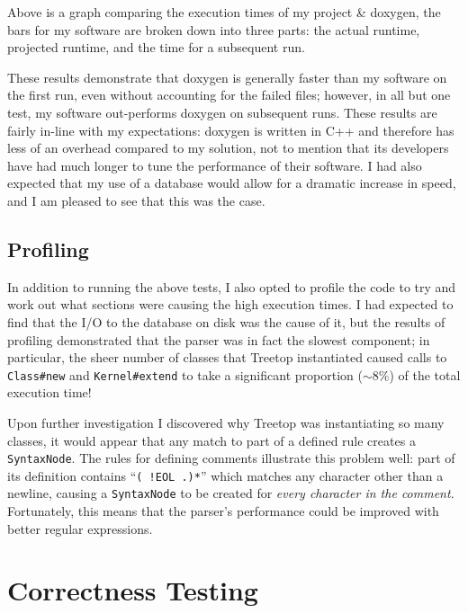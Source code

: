 \noindent{}

Above is a graph comparing the execution times of my project \& doxygen, the
bars for my software are broken down into three parts: the actual runtime,
projected runtime, and the time for a subsequent run.

These results demonstrate that doxygen is generally faster than my software on
the first run, even without accounting for the failed files; however, in all but
one test, my software out-performs doxygen on subsequent runs. These results are
fairly in-line with my expectations: doxygen is written in C++ and therefore has
less of an overhead compared to my solution, not to mention that its developers
have had much longer to tune the performance of their software. I had also
expected that my use of a database would allow for a dramatic increase in speed,
and I am pleased to see that this was the case.

  \subsection{Profiling}
  In addition to running the above tests, I also opted to profile the code to
  try and work out what sections were causing the high execution times. I had
  expected to find that the I/O to the database on disk was the cause of it, but
  the results of profiling demonstrated that the parser was in fact the slowest
  component; in particular, the sheer number of classes that Treetop
  instantiated caused calls to \lstinline|Class#new| and
  \lstinline|Kernel#extend| to take a significant proportion ($\sim$8\%) of the
  total execution time!

  Upon further investigation I discovered why Treetop was instantiating so
  many classes, it would appear that any match to part of a defined rule
  creates a \lstinline|SyntaxNode|. The rules for defining comments illustrate
  this problem well: part of its definition contains ``\lstinline|( !EOL .)*|''
  which matches any character other than a newline, causing a
  \lstinline|SyntaxNode| to be created for \emph{every character in the
  comment}. Fortunately, this means that the parser's performance could be
  improved with better regular expressions.

\section{Correctness Testing}

